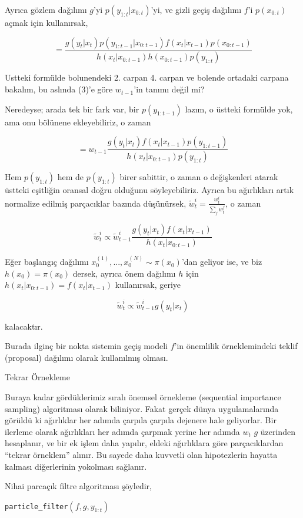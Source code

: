 \documentclass[12pt,fleqn]{article}\usepackage{../../common}
\begin{document}
Ayrıca gözlem dağılımı $g$'yi $p(y_{1:t}|x_{0:t})$'yi, ve gizli geçiş dağılımı
$f$'i $p(x_{0:t})$ açmak için kullanırsak,

$$ = \frac
{g(y_t|x_t) p(y_{1:t-1}|x_{0:t-1}) f(x_t|x_{t-1})p(x_{0:t-1}) }
{h(x_t|x_{0:t-1}) h(x_{{0:t-1}}) p(y_{1:t})}
$$

Ustteki formülde bolunendeki 2. carpan 4. carpan ve bolende ortadaki
carpana bakalım, bu aslında (3)'e göre $w_{t-1}$'in tanımı değil mi?

Neredeyse; arada tek bir fark var, bir $p(y_{1:t-1})$ lazım, o üstteki formülde
yok, ama onu bölünene ekleyebiliriz, o zaman

$$ =
w_{t-1} \frac{g(y_t|x_t) f(x_t|x_{t-1})p(y_{1:t-1}) }
{h(x_t|x_{0:t-1}) p(y_{1:t})}
$$

Hem $p(y_{1:t})$ hem de $p(y_{1:t})$ birer sabittir, o zaman o değişkenleri
atarak üstteki eşitliğin oransal doğru olduğunu söyleyebiliriz. Ayrıca bu
ağırlıkları artık normalize edilmiş parçacıklar bazında düşünürsek,
$\tilde{w}^i_t = \frac{w_t^i}{\sum_j w_t^j}$, o zaman 

$$
\tilde{w}^i_{t} \propto
\tilde{w}^i_{t-1} \frac{g(y_t|x_t) f(x_t|x_{t-1}) } {h(x_t|x_{0:t-1}) }
$$

Eğer başlangıç dağılımı $x_0^{(1)}, ..., x_0^{(N)} \sim \pi(x_0)$'dan geliyor
ise, ve biz $h(x_0) = \pi(x_0)$ dersek, ayrıca önem dağılımı $h$ için
$h(x_t|x_{0:t-1}) = f(x_t|x_{t-1})$ kullanırsak, geriye 

$$
\tilde{w}^i_{t} \propto \tilde{w}^i_{t-1} g(y_t|x_t)
$$

kalacaktır.

Burada ilginç bir nokta sistemin geçiş modeli $f$'in önemlilik örneklemindeki
teklif (proposal) dağılımı olarak kullanılmış olması. 

Tekrar Örnekleme

Buraya kadar gördüklerimiz sıralı önemsel örnekleme (sequential importance
sampling) algoritması olarak biliniyor. Fakat gerçek dünya uygulamalarında
görüldü ki ağırlıklar her adımda çarpıla çarpıla dejenere hale geliyorlar. Bir
ilerleme olarak ağırlıkları her adımda çarpmak yerine her adımda $w_t$ $g$
üzerinden hesaplanır, ve bir ek işlem daha yapılır, eldeki ağırlıklara göre
parçacıklardan ``tekrar örneklem'' alınır. Bu sayede daha kuvvetli olan
hipotezlerin hayatta kalması diğerlerinin yokolması sağlanır. 

Nihai parcaçık filtre algoritması şöyledir,


\verb!particle_filter!$\left( f, g, y_{1:t} \right)$
\end{document}
